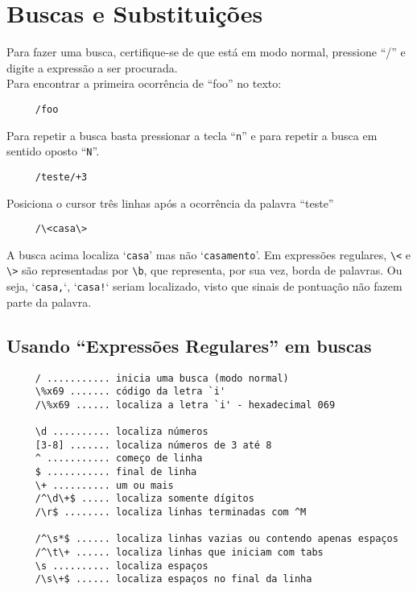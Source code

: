 
\chapter{Buscas e Substituições}\label{Buscas e substituições}

Para fazer uma busca, certifique-se de que está em modo normal,
pressione ``/'' e digite a expressão a ser procurada. \\


Para encontrar a primeira ocorrência de ``foo'' no texto:

\begin{verbatim}
     /foo
\end{verbatim}

Para repetir a busca basta pressionar a tecla ``\verb+n+'' e para
repetir a busca em sentido oposto ``\verb+N+''.

\begin{verbatim}
     /teste/+3
\end{verbatim}

Posiciona o cursor três linhas após a ocorrência da palavra ``teste'' \\

\begin{verbatim}
     /\<casa\>
\end{verbatim}

A busca acima localiza `{\tt casa}' mas não `{\tt casamento}'. Em expressões
regulares, \verb|\<| e \verb|\>| são representadas por \verb|\b|, que representa, por sua vez, borda
de palavras. Ou seja, `{\tt casa,}`, `{\tt casa!}` seriam localizado, visto que sinais
de pontuação não fazem parte da palavra.


\section{Usando ``Expressões Regulares'' em buscas}

\begin{verbatim}
     / ........... inicia uma busca (modo normal)
     \%x69 ....... código da letra `i'
     /\%x69 ...... localiza a letra `i' - hexadecimal 069

     \d .......... localiza números
     [3-8] ....... localiza números de 3 até 8
     ^ ........... começo de linha
     $ ........... final de linha
     \+ .......... um ou mais
     /^\d\+$ ..... localiza somente dígitos
     /\r$ ........ localiza linhas terminadas com ^M

     /^\s*$ ...... localiza linhas vazias ou contendo apenas espaços
     /^\t\+ ...... localiza linhas que iniciam com tabs
     \s .......... localiza espaços
     /\s\+$ ...... localiza espaços no final da linha
\end{verbatim}

